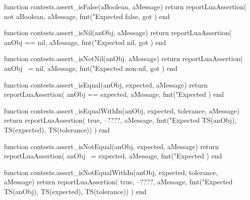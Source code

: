 \stopTestCase
\stopTestSuite


\startLuaCode
function contests.assert_isFalse(aBoolean, aMessage)
  return reportLuaAssertion(
    not aBoolean,
    aMessage,
    fmt("Expected false, got %
  )
end
\stopLuaCode

\stopTestSuite


\startLuaCode
function contests.assert_isNil(anObj, aMessage)
  return reportLuaAssertion(
    anObj == nil,
    aMessage,
    fmt("Expected nil, got %
  )
end
\stopLuaCode

\stopTestSuite


\startLuaCode
function contests.assert_isNotNil(anObj, aMessage)
  return reportLuaAssertion(
    anObj ~= nil,
    aMessage,
    fmt("Expected non-nil, got %
  )
end
\stopLuaCode

\stopTestSuite


\startLuaCode
function contests.assert_isEqual(anObj, expected, aMessage)
  return reportLuaAssertion(
    anObj == expected,
    aMessage,
    fmt("Expected %
  )
end
\stopLuaCode

\stopTestSuite


\startLuaCode
function contests.assert_isEqualWithIn(anObj, expected, tolerance, aMessage)
  return reportLuaAssertion(
    true, --????,
    aMessage,
    fmt("Expected %
      TS(anObj), TS(expected), TS(tolerance))
  )
end
\stopLuaCode

\stopTestSuite


\startLuaCode
function contests.assert_isNotEqual(anObj, expected, aMessage)
  return reportLuaAssertion(
    anObj ~= expected,
    aMessage,
    fmt("Expected %
  )
end
\stopLuaCode

\stopTestSuite

\startLuaCode
function contests.assert_isNotEqualWithIn(anObj, expected, tolerance, aMessage)
  return reportLuaAssertion(
    true, --????,
    aMessage,
    fmt("Expected %
      TS(anObj), TS(expected), TS(tolerance))
  )
end
\stopLuaCode

